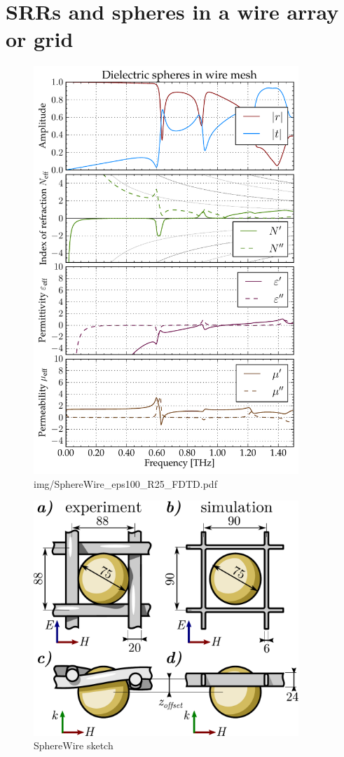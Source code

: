 \section{SRRs and spheres in a wire array or grid} %
\begin{figure} \caption{img/SphereWire\_eps100\_R25\_FDTD.pdf}  \centering  \includegraphics[width=10cm]{img/SphereWire_eps100_R25_FDTD.pdf} \end{figure} \clearpage
\begin{figure} \caption{SphereWire sketch}  \centering  \includegraphics[width=10cm]{img/SphereWire_sketch.pdf} \end{figure} \clearpage

